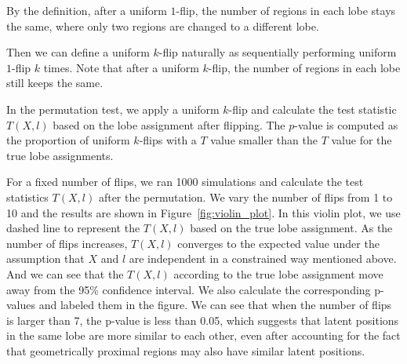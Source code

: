 By the definition, after a uniform $1$-flip, the number of regions in each lobe stays the same, where only two regions are changed to a different lobe.

Then we can define a uniform $k$-flip naturally as sequentially performing uniform $1$-flip $k$ times.
Note that after a uniform $k$-flip, the number of regions in each lobe still keeps the same.

In the permutation test, we apply a uniform $k$-flip and calculate the test statistic $T(X, l)$ based on the lobe assignment after flipping.
The $p$-value is computed as the proportion of uniform $k$-flips with a $T$ value smaller than the $T$ value for the true lobe assignments.


For a fixed number of flips, we ran 1000 simulations and calculate the test statistics $T(X, l)$ after the permutation. We vary the number of flips from 1 to 10 and the results are shown in Figure~\ref{fig:violin_plot}. In this violin plot, we use dashed line to represent the $T(X, l)$ based on the true lobe assignment. As the number of flips increases, $T(X, l)$ converges to the expected value under the assumption that $X$ and $l$ are independent in a constrained way mentioned above. And we can see that the $T(X, l)$ according to the true lobe assignment move away from the 95\% confidence interval. We also calculate the corresponding p-values and labeled them in the figure. We can see that when the number of flips is larger than 7, the p-value is less than 0.05, which suggests that latent positions in the same lobe are more similar to each other, even after accounting for the fact that geometrically proximal regions may also have similar latent positions.

